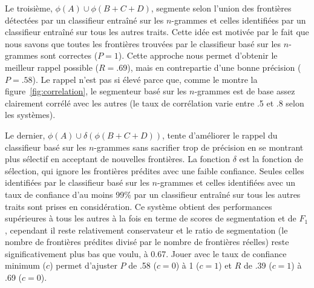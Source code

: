 Le troisième, $\phi(A) \cup \phi(B + C + D)$, segmente selon l'union des frontières détectées par un classifieur entraîné sur les $n$-grammes et celles identifiées par un classifieur entraîné sur tous les autres traits. Cette idée est motivée par le fait que nous savons que toutes les frontières trouvées par le classifieur basé sur les $n$-grammes sont correctes ($P=1$). Cette approche nous permet d'obtenir le meilleur rappel possible ($R=.69$), mais en contrepartie d'une bonne précision ($P=.58$). Le rappel n'est pas si élevé parce que, comme le montre la figure~\ref{fig:correlation}, le segmenteur basé sur les $n$-grammes est de base assez clairement corrélé avec les autres (le taux de corrélation varie entre .5 et .8 selon les systèmes).

Le dernier, $\phi(A) \cup \delta(\phi(B + C + D))$, tente d'améliorer le rappel du classifieur basé sur les $n$-grammes sans sacrifier trop de précision en se montrant plus sélectif en acceptant de nouvelles frontières. La fonction $\delta$ est la fonction de sélection, qui ignore les frontières prédites avec une faible confiance. Seules celles identifiées par le classifieur basé sur les $n$-grammes et celles identifiées avec un taux de confiance d'au moins 99\% par un classifieur entraîné sur tous les autres traits sont prises en considération. Ce système obtient des performances supérieures à tous les autres à la fois en terme de scores de segmentation et de $F_1$, cependant il reste relativement conservateur et le ratio de segmentation (le nombre de frontières prédites divisé par le nombre de frontières réelles) reste significativement plus bas que voulu, à 0.67. Jouer avec le taux de confiance minimum ($c$) permet d'ajuster $P$ de .58 ($c = 0$) à 1 ($c = 1$) et $R$ de .39 ($c = 1$) à .69 ($c = 0$).

\medskip\noindent

